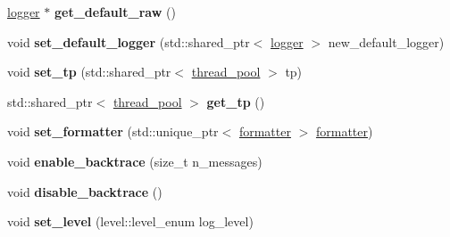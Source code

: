 \begin{DoxyCompactItemize}
\item 
\mbox{\label{classspdlog_1_1details_1_1registry_a4b75c50f0b310b84d2a93f3f1badd5a3}} 
\hyperlink{classspdlog_1_1logger}{logger} $\ast$ {\bfseries get\+\_\+default\+\_\+raw} ()
\item 
\mbox{\label{classspdlog_1_1details_1_1registry_a6aa709e8d71603cbe699e49f26223add}} 
void {\bfseries set\+\_\+default\+\_\+logger} (std\+::shared\+\_\+ptr$<$ \hyperlink{classspdlog_1_1logger}{logger} $>$ new\+\_\+default\+\_\+logger)
\item 
\mbox{\label{classspdlog_1_1details_1_1registry_a4e5f3349b2d5d75cbd54994250fbb5a3}} 
void {\bfseries set\+\_\+tp} (std\+::shared\+\_\+ptr$<$ \hyperlink{classspdlog_1_1details_1_1thread__pool}{thread\+\_\+pool} $>$ tp)
\item 
\mbox{\label{classspdlog_1_1details_1_1registry_a7f9cefccc6f882c1e750601197488a5a}} 
std\+::shared\+\_\+ptr$<$ \hyperlink{classspdlog_1_1details_1_1thread__pool}{thread\+\_\+pool} $>$ {\bfseries get\+\_\+tp} ()
\item 
\mbox{\label{classspdlog_1_1details_1_1registry_a2830cfb77b386e1c9dd93162e91a266c}} 
void {\bfseries set\+\_\+formatter} (std\+::unique\+\_\+ptr$<$ \hyperlink{classspdlog_1_1formatter}{formatter} $>$ \hyperlink{classspdlog_1_1formatter}{formatter})
\item 
\mbox{\label{classspdlog_1_1details_1_1registry_ae6dbe968bbe026a47d39592840a24126}} 
void {\bfseries enable\+\_\+backtrace} (size\+\_\+t n\+\_\+messages)
\item 
\mbox{\label{classspdlog_1_1details_1_1registry_a58bbae0e839ff62701d1c89c0689f86e}} 
void {\bfseries disable\+\_\+backtrace} ()
\item 
\mbox{\label{classspdlog_1_1details_1_1registry_af734fefd6c4c8c45edc2b32713a1982b}} 
void {\bfseries set\+\_\+level} (level\+::level\+\_\+enum log\+\_\+level)
\item 

\end{DoxyCompactItemize}
